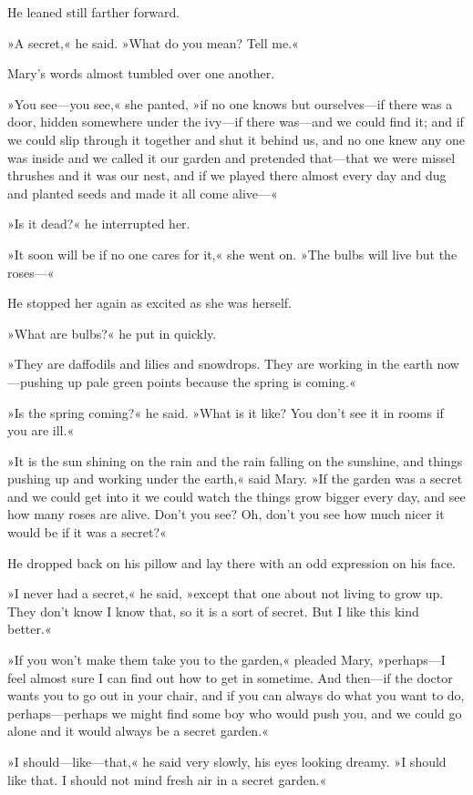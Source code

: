 He leaned still farther forward.

»A secret,« he said. »What do you mean? Tell me.«

Mary's words almost tumbled over one another.

»You see—you see,« she panted, »if no one knows but ourselves—if there was a door, hidden somewhere under the ivy—if there was—and we could find it; and if we could slip through it together and shut it behind us, and no one knew any one was inside and we called it our garden and pretended that—that we were missel thrushes and it was our nest, and if we played there almost every day and dug and planted seeds and made it all come alive—«

»Is it dead?« he interrupted her.

»It soon will be if no one cares for it,« she went on. »The bulbs will live but the roses—«

He stopped her again as excited as she was herself.

»What are bulbs?« he put in quickly.

»They are daffodils and lilies and snowdrops. They are working in the earth now—pushing up pale green points because the spring is coming.«

»Is the spring coming?« he said. »What is it like? You don't see it in rooms if you are ill.«

»It is the sun shining on the rain and the rain falling on the sunshine, and things pushing up and working under the earth,« said Mary. »If the garden was a secret and we could get into it we could watch the things grow bigger every day, and see how many roses are alive. Don't you see? Oh, don't you see how much nicer it would be if it was a secret?«

He dropped back on his pillow and lay there with an odd expression on his face.

»I never had a secret,« he said, »except that one about not living to grow up. They don't know I know that, so it is a sort of secret. But I like this kind better.«

»If you won't make them take you to the garden,« pleaded Mary, »perhaps—I feel almost sure I can find out how to get in sometime. And then—if the doctor wants you to go out in your chair, and if you can always do what you want to do, perhaps—perhaps we might find some boy who would push you, and we could go alone and it would always be a secret garden.«

»I should—like—that,« he said very slowly, his eyes looking dreamy. »I should like that. I should not mind fresh air in a secret garden.«

